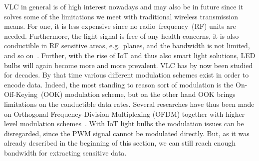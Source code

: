 VLC in general is of high interest nowadays and may also be in future since it solves some of the limitations we meet with traditional wireless transmission means. For one, it is less expensive since no radio~frequency~(RF) units are needed. Furthermore, the light signal is free of any health concerns, it is also conductible in RF sensitive areas, e.g.\ planes, and the bandwidth is not limited, and so on~\cite{Elgala:2007:OVLWCBoWL}. Further, with the rise of IoT and thus also smart light solutions, LED bulbs will again become more and more prevalent.
VLC has by now been studied for decades. By that time various different modulation schemes exist in order to encode data. Indeed, the most standing to reason sort of modulation is the On-Off-Keying~(OOK) modulation scheme, but on the other hand OOK brings limitations on the conductible data rates. Several researches have thus been made on Orthogonal Frequency-Division Multiplexing (OFDM) together with higher level modulation schemes~\cite{Elgala:2007:OVLWCBoWL,Yu:2014:BCDRCVLOS}. With IoT light bulbs the modulation issues can be disregarded, since the PWM signal cannot be modulated directly. But, as it was already described in the beginning of this section, we can still reach enough bandwidth for extracting sensitive data.
